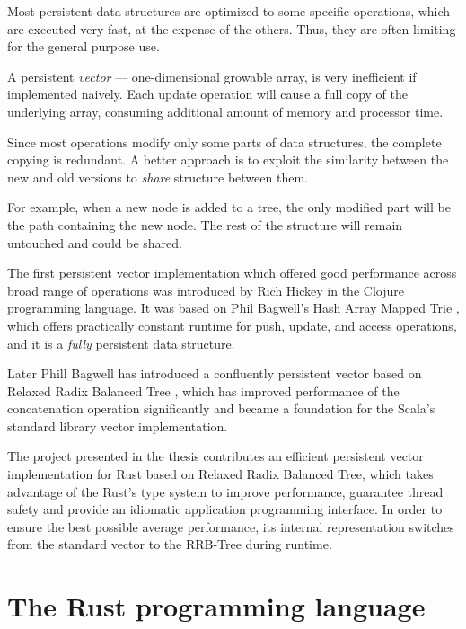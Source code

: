 Most persistent data structures are optimized to some specific operations, which are executed very fast, at the expense of the others. Thus, they are often limiting for the general purpose use. 

A persistent \emph{vector} --- one-dimensional growable array, is very inefficient if implemented naively. Each update operation will cause a full copy of the underlying array, consuming additional amount of memory and processor time. 

Since most operations modify only some parts of data structures, the complete copying is redundant. A better approach is to exploit the similarity between the new and old versions to \emph{share} structure between them. 

For example, when a new node is added to a tree, the only modified part will be the path containing the new node. The rest of the structure will remain untouched and could be shared. 

The first persistent vector implementation which offered good performance across broad range of operations was introduced by Rich Hickey in the Clojure programming language. It was based on Phil Bagwell's Hash Array Mapped Trie \cite{ideal-hash-trees}, which offers practically constant runtime for push, update, and access operations, and it is a \emph{fully} persistent data structure. 

Later Phill Bagwell has introduced a confluently persistent vector based on Relaxed Radix Balanced Tree \cite{efficient-immutable-vectors}, which has improved performance of the concatenation operation significantly and became a foundation for the Scala's standard library vector implementation. 

The project presented in the thesis contributes an efficient persistent vector implementation for Rust based on Relaxed Radix Balanced Tree, which takes advantage of the Rust's type system to improve performance, guarantee thread safety and provide an idiomatic application programming interface. In order to ensure the best possible average performance, its internal representation switches from the standard vector to the RRB-Tree during runtime. 

\section{The Rust programming language}


